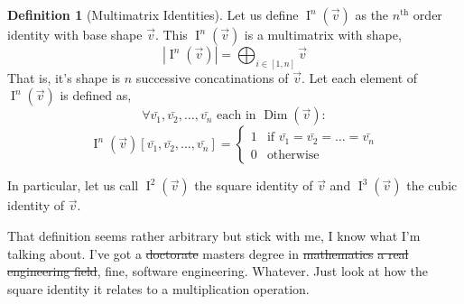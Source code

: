 \documentclass[12pt]{book}
\theoremstyle{definition}
\newtheorem{definition}{Definition}[chapter]
\theoremstyle{plain}
\theoremstyle{ppart}
\theoremstyle{case}
\theoremstyle{solution}
\DeclareMathOperator{\Dim}{Dim}
\DeclareMathOperator{\Ident}{I}
\begin{document}
\begin{definition}[Multimatrix Identities]
\label{mm_mult_ident}
Let us define $\Ident^n(\vec{v})$ as the $n^{\text{th}}$ order identity with base shape
$\vec{v}$. This $\Ident^n(\vec{v})$ is a multimatrix with shape,
\[ |\Ident^n(\vec{v})| = \bigoplus_{i \in [1, n]} \vec{v} \]
That is, it's shape is $n$ successive concatinations of $\vec{v}$.
Let each element of $\Ident^n(\vec{v})$ is defined as,
\[ \forall \bar{v_1}, \bar{v_2}, \ldots, \bar{v_n} \text{ each in } \Dim(\vec{v}) : \]
\[
 \Ident^n(\vec{v})[\bar{v_1}, \bar{v_2}, \ldots, \bar{v_n}]
 = \left\{
  \begin{array}{ll}
    1 & \mbox{if } \bar{v_1} = \bar{v_2} = \ldots = \bar{v_n} \\
    0 & \mbox{otherwise}
  \end{array}
 \right.
\]

In particular, let us call $\Ident^2(\vec{v})$ the square identity of $\vec{v}$ and
$\Ident^3(\vec{v})$ the cubic identity of $\vec{v}$.
\end{definition}

That definition seems rather arbitrary but stick with me, I know what I'm
talking about. I've got a \sout{doctorate}
masters degree in \sout{mathematics} \sout{a real engineering field}, fine, software
engineering. Whatever. Just look at how the
square identity it relates to a multiplication operation.
\end{document}
